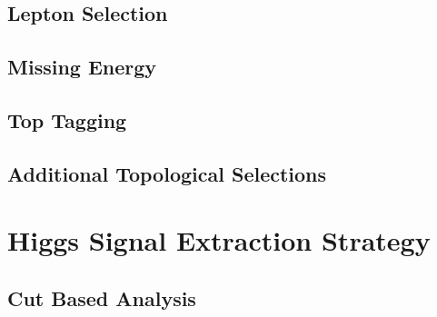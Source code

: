\documentclass{cmspaper}
\begin{document}
  \subsection{Lepton Selection} 
    \label{sec:sel_lepton}
   
%   
%    
  \subsection{Missing Energy} 
    \label{sec:sel_met}
    
%    
  \subsection{Top Tagging}
    \label{sec:sel_toptag}
    
  \subsection{Additional Topological Selections}
    \label{sec:sel_other}
    

%  
\clearpage    

\section{Higgs Signal Extraction Strategy}
  
  \label{sec:signal_selection}
  \subsection{Cut Based Analysis}
    \label{sec:anal_cutbased}
    
\end{document}
